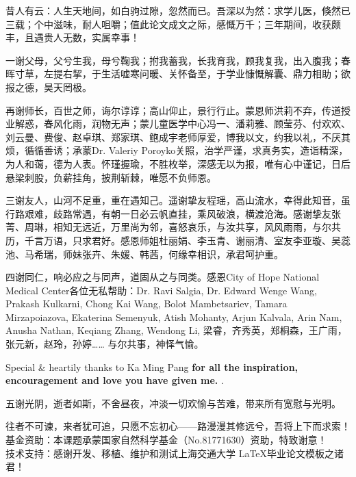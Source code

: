 \begin{thanks}
  昔人有云：人生天地间，如白驹过隙，忽然而已。吾深以为然：求学儿医，倏然已三载；个中滋味，耐人咀嚼；值此论文成文之际，感慨万千；三年期间，收获颇丰，且遇贵人无数，实属幸事！

  一谢父母，父兮生我，母兮鞠我；拊我蓄我，长我育我，顾我复我，出入腹我；春晖寸草，左提右挈，于生活嘘寒问暖、关怀备至，于学业慷慨解囊、鼎力相助；欲报之德，昊天罔极。

  再谢师长，百世之师，诲尔谆谆；高山仰止，景行行止。蒙恩师洪莉不弃，传道授业解惑，春风化雨，润物无声；蒙儿童医学中心冯一、潘莉雅、顾莹芬、付欢欢、刘云曼、费俊、赵卓琪、郑家琪、鲍成宇老师厚爱，博我以文，约我以礼，不厌其烦，循循善诱；承蒙Dr. Valeriy Poroyko关照，治学严谨，求真务实，造诣精深，为人和蔼，德为人表。怀瑾握瑜，不胜枚举，深感无以为报，唯有心中谨记，日后悬梁刺股，负薪挂角，披荆斩棘，唯愿不负师恩。

  三谢友人，山河不足重，重在遇知己。遥谢挚友程瑶，高山流水，幸得此知音，虽行路艰难，歧路常遇，有朝一日必云帆直挂，乘风破浪，横渡沧海。感谢挚友张菁、周琳，相知无远近，万里尚为邻，喜怒哀乐，与汝共享，风风雨雨，与尔共历，千言万语，只求君好。感恩师姐杜丽娟、李玉青、谢丽清、室友李亚璇、吴蕊池、马希瑞，师妹张卉、朱媛、韩茜，何缘幸相识，承君呵护重。

  四谢同仁，响必应之与同声，道固从之与同类。感恩City of Hope National Medical Center各位无私帮助：Dr. Ravi Salgia, Dr. Edward Wenge Wang, Prakash Kulkarni, Chong Kai Wang, Bolot Mambetsariev, Tamara Mirzapoiazova, Ekaterina Semenyuk, Atish Mohanty, Arjun Kalvala, Arin Nam, Anusha Nathan, Keqiang Zhang, Wendong Li, 梁睿，齐秀英，郑桐森，王广雨，张元新，赵玲，孙婷…… 与尔共事，神怿气愉。

  Special \& heartily thanks to Ka Ming Pang \textbf{for all the inspiration, encouragement and love you have given me. }.

  五谢光阴，逝者如斯，不舍昼夜，冲淡一切欢愉与苦难，带来所有宽慰与光明。

  往者不可谏，来者犹可追，只愿不忘初心——路漫漫其修远兮，吾将上下而求索！\\
  基金资助：本课题承蒙国家自然科学基金（No.81771630）资助，特致谢意！\\
  技术支持：感谢开发、移植、维护和测试上海交通大学 \LaTeX 毕业论文模板之诸君！\\
\end{thanks}
